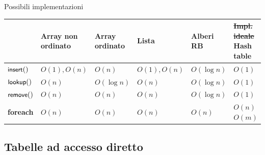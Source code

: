 \begin{frame}{Possibili implementazioni}

{\footnotesize
\begin{tabular}{ | P{1.3cm} | P{1.7cm} | P{1.5cm} | P{1.6cm} | P{1.6cm} | P{1.8cm} |}
\hline
& \textbf{Array non ordinato} & 	\textbf{Array ordinato} & \textbf{Lista} & \textbf{Alberi RB} & \sout{\textbf{Impl. ideale}} \textbf{Hash table} \\\hline
$\textsf{{\small insert}}()$ & $O(1),O(n)$ & $O(n)$ & $O(1), O(n)$ & $O(\log n)$ & $O(1)$ \\\hline
$\textsf{{\small lookup}}()$ & $O(n)$ & $O(\log n)$ &  $O(n)$ &  $O(\log n)$ &  $O(1)$\\\hline
$\textsf{{\small remove}}()$ & $O(n)$ & $O(n)$ & $O(n)$ & $O(\log n)$ & $O(1)$\\\hline
\textbf{foreach} & $O(n)$ & $O(n)$ & $O(n)$ & $O(n)$ & \alert{\sout{$O(n)$}$O(m)$}\\\hline
\end{tabular}
}

\end{frame}


\subsection{Tabelle ad accesso diretto}


